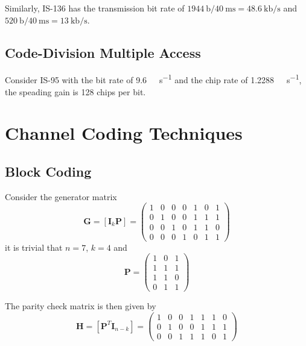 \documentclass[a4paper,12pt]{article}
\newcommand{\bit}{\mathrm{b}}
\newcommand{\chip}{\mathrm{c}}
\begin{document}
Similarly, IS-136 has the transmission bit rate of $\SI{1944}{\bit}
/ \SI{40}{\milli\second} = \SI{48.6}{\kilo\bit\per\second}$ and $\SI{520}{\bit}
/ \SI{40}{\milli\second} = \SI{13}{\kilo\bit\per\second}$.

\subsection{Code-Division Multiple Access}
Consider IS-95 with the bit rate of \SI{9.6}{\kilo\bit\per\second}
and the chip rate of \SI{1.2288}{\mega\chip\per\second}, the speading gain
is 128 chips per bit.

\section{Channel Coding Techniques}

\subsection{Block Coding}
Consider the generator matrix
\[\mathbf G = [\mathbf I_k \mathbf P] = \begin{pmatrix}
  1&0&0&0&1&0&1\\
  0&1&0&0&1&1&1\\
  0&0&1&0&1&1&0\\
  0&0&0&1&0&1&1
\end{pmatrix}\]
it is trivial that $n = 7$, $k = 4$ and
\[\mathbf P = \begin{pmatrix}
  1&0&1\\
  1&1&1\\
  1&1&0\\
  0&1&1
\end{pmatrix}\]

The parity check matrix is then given by
\[\mathbf H = [\mathbf P^T \mathbf I_{n-k}] = \begin{pmatrix}
  1&0&0&1&1&1&0\\
  0&1&0&0&1&1&1\\
  0&0&1&1&1&0&1
\end{pmatrix}\]
\end{document}
